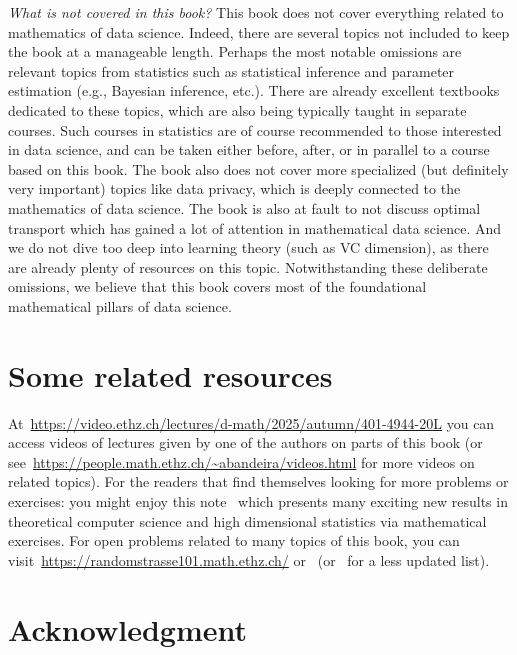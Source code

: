 \emph{What is not covered in this book? }
This book does not cover everything related to mathematics of data science. Indeed, there are several topics not included to keep the book at a manageable length. 
Perhaps the most notable omissions are relevant topics from statistics such as statistical inference and parameter estimation (e.g., Bayesian inference, etc.). There are already excellent textbooks dedicated to these topics, which are also being typically taught in separate courses. Such courses in statistics are of course recommended to those interested in data science, and can be taken either before, after, or in parallel to a course based on this book. The book also does not cover more specialized (but definitely very important) topics like data privacy, which is deeply connected to the mathematics of data science. The book is also at fault to not discuss optimal transport which has gained a lot of attention in mathematical data science. And we do not dive too deep into learning theory (such as VC dimension), as there are already plenty of resources on this topic. Notwithstanding these deliberate omissions, we believe that this book covers most of the foundational mathematical pillars of data science. 






\section{Some related resources}


At~{\footnotesize{\url{https://video.ethz.ch/lectures/d-math/2025/autumn/401-4944-20L}}} you can access videos of lectures given by one of the authors on parts of this book (or see~{\footnotesize{\url{https://people.math.ethz.ch/~abandeira/videos.html}}} for more videos on related topics).
For the readers that find themselves looking for more problems or exercises: you might enjoy this note~\cite{JigSawStatCompGaps2025} which presents many exciting new results in theoretical computer science and high dimensional statistics via mathematical exercises. For open problems related to many topics of this book, you can visit~{\footnotesize{\url{https://randomstrasse101.math.ethz.ch/}}} or~\cite{RandomstrasseProblems2024} (or~\cite{Afonso_10L42P} for a less updated list).

\section*{Acknowledgment}

